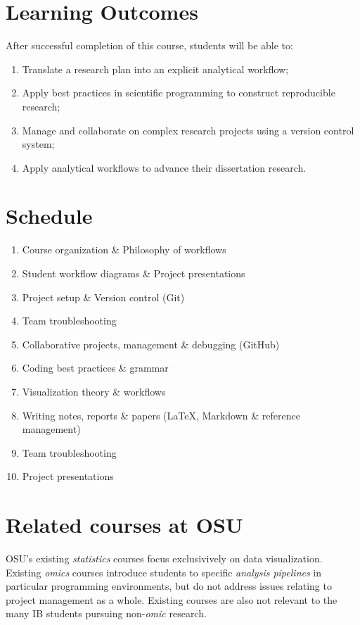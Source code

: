 \documentclass[10pt]{article}
\begin{document}
\section*{Learning Outcomes}
After successful completion of this course, students will be able to:
\begin{enumerate}
	\itemsep0em
	\item Translate a research plan into an explicit analytical workflow;
	\item Apply best practices in scientific programming to construct reproducible research;
	\item Manage and collaborate on complex research projects using a version control system;
	\item Apply analytical workflows to advance their dissertation research.
\end{enumerate}


\section*{Schedule}
\begin{enumerate}[label=\bfseries Week \arabic*:,leftmargin=*,labelindent=1em]
	\itemsep0em
	\item Course organization \& Philosophy of workflows
	\item Student workflow diagrams \& Project presentations
	\item Project setup \& Version control (Git)
	\item Team troubleshooting
	\item Collaborative projects, management \& debugging (GitHub)
	\item Coding best practices \& grammar
	\item Visualization theory \& workflows
	\item Writing notes, reports \& papers (\LaTeX, Markdown \& reference management)
	\item Team troubleshooting
	\item Project presentations
\end{enumerate}



\section*{Related courses at OSU}
OSU's existing \emph{statistics} courses focus exclusivively on data visualization.
Existing \emph{omics} courses introduce students to specific \emph{analysis pipelines} in particular programming environments, but do not address issues relating to project management as a whole.
Existing courses are also not relevant to the many IB students pursuing non-\emph{omic} research.
\end{document}
